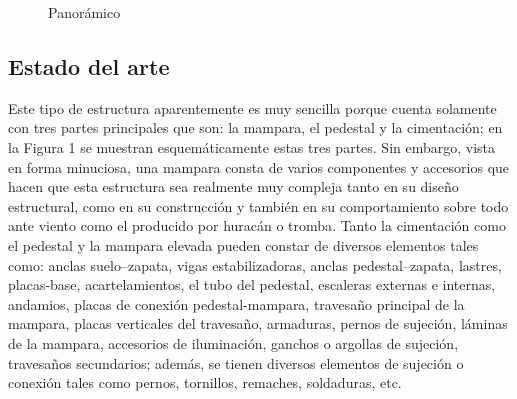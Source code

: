 \documentclass{article}
\begin{document}
\begin{figure}[!tbp]
  \centering
  \hfill
  \caption{Panorámico}
\end{figure}
\newpage
\subsection{Estado del arte}
Este tipo de estructura aparentemente es muy sencilla porque cuenta solamente con tres partes principales que son: la mampara, el pedestal y la cimentación; en la Figura 1 se muestran esquemáticamente estas tres partes. Sin embargo, vista en forma minuciosa, una mampara consta de varios componentes y accesorios que hacen que esta estructura sea realmente muy compleja tanto en su diseño estructural, como en su construcción y también en su comportamiento sobre todo ante viento como el producido por huracán o tromba\cite{rf3}. Tanto la cimentación como el pedestal y la mampara elevada pueden constar de diversos elementos tales como: anclas suelo–zapata, vigas estabilizadoras, anclas pedestal–zapata, lastres, placas-base, acartelamientos, el tubo del pedestal, escaleras externas e internas, andamios, placas de conexión pedestal-mampara, travesaño principal de la mampara, placas verticales del travesaño, armaduras, pernos de sujeción, láminas de la mampara, accesorios de iluminación, ganchos o argollas de sujeción, travesaños secundarios; además, se tienen diversos elementos de sujeción o conexión tales como pernos, tornillos, remaches, soldaduras, etc.
\newpage
\end{document}
